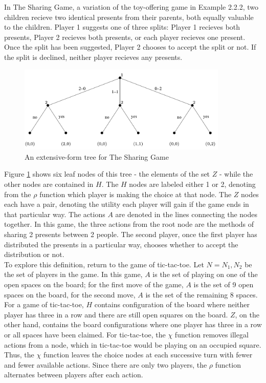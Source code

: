 \begin{exmp}
  In The Sharing Game, a variation of the toy-offering game in Example 2.2.2, two children recieve two identical presents from their parents, both equally valuable to the children. Player 1 suggests one of three splits: Player 1 recieves both presents, Player 2 recieves both presents, or each player recieves one present. Once the split has been suggested, Player 2 chooses to accept the split or not. If the split is declined, neither player recieves any presents.

  \begin{figure}[H]
    \centering
    \includegraphics[width=10cm]{figures/ExampleTree.png}
    \caption{An extensive-form tree for The Sharing Game \cite{shoh09}}
    \label{fig:sharingTree}
  \end{figure}
\end{exmp}

Figure \ref{fig:sharingTree} shows six leaf nodes of this tree - the elements of the set $Z$ - while the other nodes are contained in $H$. The $H$ nodes are labeled either 1 or 2, denoting from the $\rho$ function which player is making the choice at that node. The $Z$ nodes each have a pair, denoting the utility each player will gain if the game ends in that particular way. The actions $A$ are denoted in the lines connecting the nodes together. In this game, the three actions from the root node are the methods of sharing 2 presents between 2 people. The second player, once the first player has distributed the presents in a particular way, chooses whether to accept the distribution or not.\\

To explore this definition, return to the game of tic-tac-toe. Let $N={N_1, N_2}$ be the set of players in the game. In this game, $A$ is the set of playing on one of the open spaces on the board; for the first move of the game, $A$ is the set of 9 open spaces on the board, for the second move, $A$ is the set of the remaining 8 spaces. For a game of tic-tac-toe, $H$ contains configuration of the board where neither player has three in a row and there are still open squares on the board. $Z$, on the other hand, contains the board configurations where one player has three in a row or all spaces have been claimed. For tic-tac-toe, the $\chi$ function removes illegal actions from a node, which in tic-tac-toe would be playing on an occupied square. Thus, the $\chi$ function leaves the choice nodes at each successive turn with fewer and fewer available actions. Since there are only two players, the $\rho$ function alternates between players after each action.

